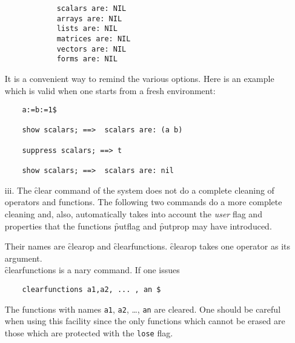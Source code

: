 \begin{itemize}
\begin{verbatim}
            scalars are: NIL
            arrays are: NIL
            lists are: NIL
            matrices are: NIL
            vectors are: NIL
            forms are: NIL
\end{verbatim}
It is a convenient way to remind the various options. Here is an example
which is valid when one starts from a fresh environment:
\begin{verbatim}
    a:=b:=1$

    show scalars; ==>  scalars are: (a b)

    suppress scalars; ==> t

    show scalars; ==>  scalars are: nil
\end{verbatim}
\item[iii.]
The \f{clear} command  of the system does not do a complete cleaning of
operators and functions. The following two commands do a more
complete cleaning and, also, automatically takes into account the
\emph{user} flag and properties that the functions
\f{putflag} and \f{putprop} may have introduced.

\hypertarget{operator:CLEAROP}{}
\hypertarget{operator:CLEARFUNCTIONS}{}
Their names are \f{clearop} and \f{clearfunctions}.
\f{clearop} takes one operator as its argument.\\
\f{clearfunctions} is a nary command. If one issues
\begin{verbatim}
    clearfunctions a1,a2, ... , an $
\end{verbatim}
The functions with names \texttt{a1}, \texttt{a2}, \ldots, \texttt{an} are cleared.
One should be careful when  using this facility since the
only functions which cannot be erased are those which are
protected with the \texttt{lose} flag.
\end{itemize}

